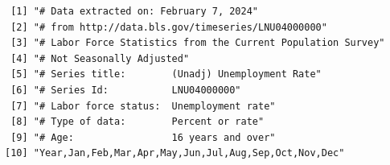 \begin{frame}[fragile]

\vspace{-3mm}

\begin{knitrout}\small
{}\color{fgcolor}\begin{kframe}
\begin{alltt}
\hlstd{(}\hlstd{,}\hlstd{=}\hlstd{)}
\end{alltt}
\end{kframe}
\end{knitrout}

\vspace{-3mm}

\begin{knitrout}\small
{}\color{fgcolor}\begin{kframe}
\begin{verbatim}
 [1] "# Data extracted on: February 7, 2024"                      
 [2] "# from http://data.bls.gov/timeseries/LNU04000000"          
 [3] "# Labor Force Statistics from the Current Population Survey"
 [4] "# Not Seasonally Adjusted"                                  
 [5] "# Series title:        (Unadj) Unemployment Rate"           
 [6] "# Series Id:           LNU04000000"                         
 [7] "# Labor force status:  Unemployment rate"                   
 [8] "# Type of data:        Percent or rate"                     
 [9] "# Age:                 16 years and over"                   
[10] "Year,Jan,Feb,Mar,Apr,May,Jun,Jul,Aug,Sep,Oct,Nov,Dec"       
\end{verbatim}
\end{kframe}
\end{knitrout}

\vspace{-3mm}

\begin{knitrout}\small
{}\color{fgcolor}\begin{kframe}
\begin{alltt}
 \hlkwb{<-} \hlstd{(}\hlstd{=}\hlstd{,}
  \hlstd{=}\hlstd{,}\hlstd{=}\hlstd{)}
\hlstd{)}
\end{alltt}
\end{kframe}
\end{knitrout}


\end{frame}
